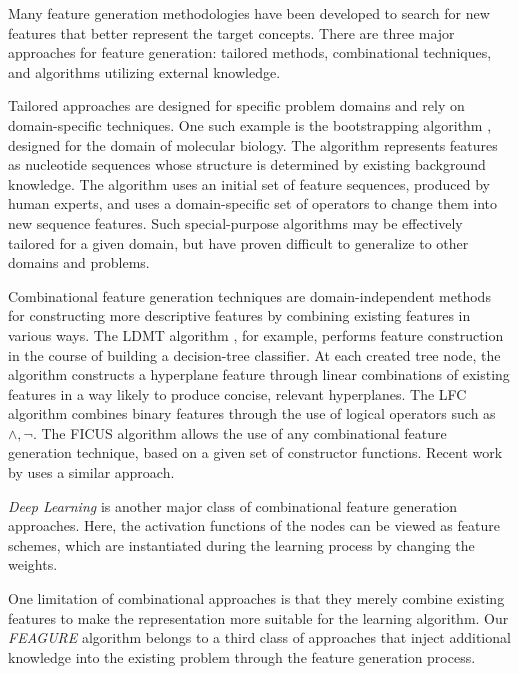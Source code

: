 \documentclass[twoside,11pt]{article}
\theoremstyle{definition}
\begin{document}
Many feature generation methodologies have been developed to search for new features that better represent the target concepts. There are three major approaches for feature generation: tailored methods, combinational techniques, and algorithms utilizing external knowledge.

Tailored approaches \cite{sutton1991learning,hirsh1994bootstrapping} are designed for specific problem domains and rely on domain-specific techniques. %
One such example is the bootstrapping algorithm \cite{hirsh1994bootstrapping}, designed for the domain of molecular biology. The algorithm represents features as nucleotide sequences whose structure is determined by existing background knowledge. The algorithm uses an initial set of feature sequences, produced by human experts, and uses a domain-specific set of operators to change them into new sequence features. 
Such special-purpose algorithms  may be effectively tailored for a given domain, but have proven difficult to generalize to other domains and problems.

Combinational feature generation techniques are domain-independent methods for constructing more descriptive features by combining existing features in various ways. The LDMT algorithm \cite{utgo1991linear}, for example, performs feature construction in the course of building a decision-tree classifier. At each created tree node, the algorithm constructs a hyperplane feature through linear combinations of existing features in a way likely to produce concise, relevant hyperplanes. The LFC algorithm \cite{ragavan1993complex} combines binary features through the use of logical operators such as $\land ,\lnot$.
The FICUS algorithm \cite{markovitch2002feature} allows the use of any combinational feature generation technique, based on a given set of constructor functions. Recent work by  uses a similar approach.

\emph{Deep Learning}  is another major class of combinational feature generation approaches. Here, the activation functions of the nodes can be viewed as feature schemes, which are instantiated during the learning process by changing the weights.

One limitation of combinational approaches is that they merely combine existing features to make the representation more suitable for the 
learning algorithm. 
Our \emph{FEAGURE} algorithm belongs to a third class of approaches that inject additional knowledge into the existing problem through the feature generation process.
	
\end{document}
